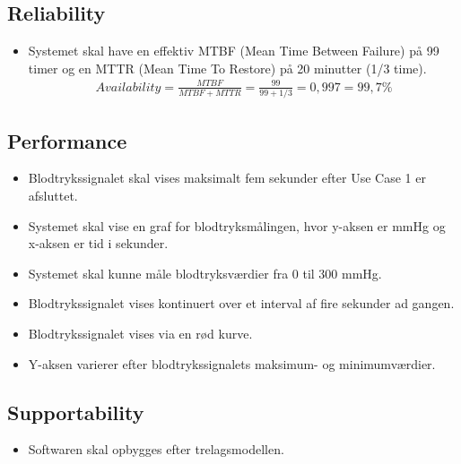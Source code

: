 \subsection{Reliability}
\begin{itemize}
	\item Systemet skal have en effektiv MTBF (Mean Time Between Failure) på 99 timer og en MTTR (Mean Time To Restore) på 20 minutter (1/3 time).
				\begin{align}
					Availability = \frac{MTBF}{MTBF+MTTR} = \frac{99}{99+1/3} = 0,997 = 99,7 \%
				\end{align}

\end{itemize}

\subsection{Performance}
\begin{itemize}
	\item Blodtrykssignalet skal vises maksimalt fem sekunder efter Use Case 1 er afsluttet.
	\item Systemet skal vise en graf for blodtryksmålingen, hvor y-aksen er mmHg og x-aksen er tid i sekunder.
	\item Systemet skal kunne måle blodtryksværdier fra 0 til 300 mmHg.
	\item Blodtrykssignalet vises kontinuert over et interval af fire sekunder ad gangen.
	\item Blodtrykssignalet vises via en rød kurve. 
	\item Y-aksen varierer efter blodtrykssignalets maksimum- og minimumværdier.  
\end{itemize}

\subsection{Supportability}
\begin{itemize}
	\item Softwaren skal opbygges efter trelagsmodellen.
\end{itemize}

